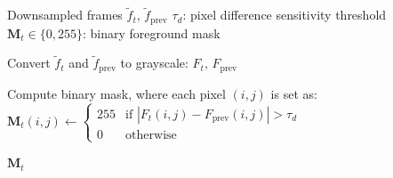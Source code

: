 \documentclass{article}
\begin{document}
\begin{preview}

\setcounter{algorithm}{1} %

\begin{algorithm}[H]
    \caption{Frame Difference Detector (FrameDiffDet)}
    \label{alg:framediff_det}
    \begin{algorithmic}[2]

        \Require Downsampled frames $\tilde{f}_t,\, \tilde{f}_{\text{prev}}$
        \Require $\tau_d$: pixel difference sensitivity threshold
        \Ensure $\mathbf{M}_t \in \{0, 255\}$: binary foreground mask

        \Statex

        \State Convert $\tilde{f}_t$ and $\tilde{f}_{\text{prev}}$ to grayscale:
               $F_t,\, F_{\text{prev}}$

        \Statex

        \State Compute binary mask, where each pixel $(i,j)$ is set as:
        \Statex \quad $\mathbf{M}_t(i,j) \leftarrow
            \begin{cases}
                255 & \text{if } |F_t(i,j) - F_{\text{prev}}(i,j)| > \tau_d \\
                0   & \text{otherwise}
            \end{cases}$

        \State \Return $\mathbf{M}_t$

    \end{algorithmic}
\end{algorithm}


\end{preview}
\end{document}
